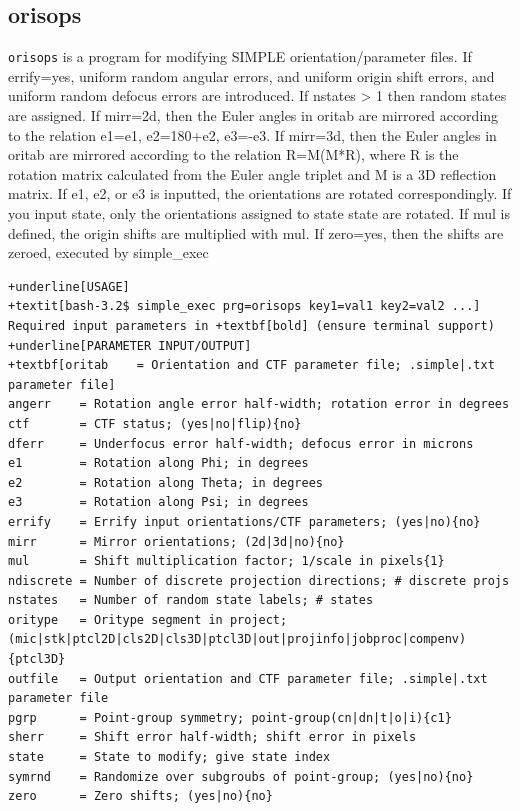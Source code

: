 \documentclass[a4paper,11pt]{article}
\newcommand{\prgname}[1]{\textcolor{NavyBlue}{\texttt{#1}}}
\begin{document}
\subsection{orisops}
\label{orisops}
\prgname{orisops} is a program for modifying SIMPLE orientation/parameter files. If errify=yes, uniform random angular errors, and uniform origin shift errors, and uniform random defocus errors are introduced. If nstates > 1 then random states are assigned. If mirr=2d, then the Euler angles in oritab are mirrored according to the relation e1=e1, e2=180+e2, e3=-e3. If mirr=3d, then the Euler angles in oritab are mirrored according to the relation R=M(M*R), where R is the rotation matrix calculated from the Euler angle triplet and M is a 3D reflection matrix. If e1, e2, or e3 is inputted, the orientations are rotated correspondingly. If you input state, only the orientations assigned to state state are rotated. If mul is defined, the origin shifts are multiplied with mul. If zero=yes, then the shifts are zeroed, executed by simple\_exec
\begin{Verbatim}[commandchars=+\[\],fontsize=\small,breaklines=true]
+underline[USAGE]
+textit[bash-3.2$ simple_exec prg=orisops key1=val1 key2=val2 ...]
Required input parameters in +textbf[bold] (ensure terminal support)
+underline[PARAMETER INPUT/OUTPUT]
+textbf[oritab    = Orientation and CTF parameter file; .simple|.txt parameter file]
angerr    = Rotation angle error half-width; rotation error in degrees
ctf       = CTF status; (yes|no|flip){no}
dferr     = Underfocus error half-width; defocus error in microns
e1        = Rotation along Phi; in degrees
e2        = Rotation along Theta; in degrees
e3        = Rotation along Psi; in degrees
errify    = Errify input orientations/CTF parameters; (yes|no){no}
mirr      = Mirror orientations; (2d|3d|no){no}
mul       = Shift multiplication factor; 1/scale in pixels{1}
ndiscrete = Number of discrete projection directions; # discrete projs
nstates   = Number of random state labels; # states
oritype   = Oritype segment in project; (mic|stk|ptcl2D|cls2D|cls3D|ptcl3D|out|projinfo|jobproc|compenv){ptcl3D}
outfile   = Output orientation and CTF parameter file; .simple|.txt parameter file
pgrp      = Point-group symmetry; point-group(cn|dn|t|o|i){c1}
sherr     = Shift error half-width; shift error in pixels
state     = State to modify; give state index
symrnd    = Randomize over subgroubs of point-group; (yes|no){no}
zero      = Zero shifts; (yes|no){no}
\end{Verbatim}
\end{document}
